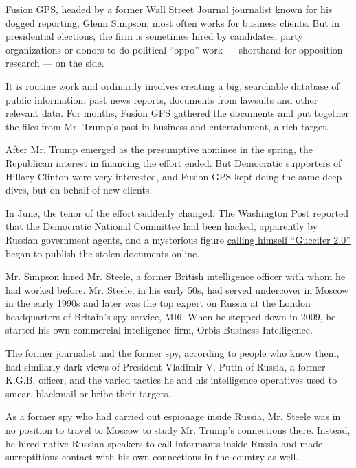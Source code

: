 Fusion GPS, headed by a former Wall Street Journal journalist known for
his dogged reporting, Glenn Simpson, most often works for business
clients. But in presidential elections, the firm is sometimes hired by
candidates, party organizations or donors to do political ``oppo'' work
--- shorthand for opposition research --- on the side.

It is routine work and ordinarily involves creating a big, searchable
database of public information: past news reports, documents from
lawsuits and other relevant data. For months, Fusion GPS gathered the
documents and put together the files from Mr. Trump's past in business
and entertainment, a rich target.

After Mr. Trump emerged as the presumptive nominee in the spring, the
Republican interest in financing the effort ended. But Democratic
supporters of Hillary Clinton were very interested, and Fusion GPS kept
doing the same deep dives, but on behalf of new clients.

In June, the tenor of the effort suddenly changed.
\href{https://www.washingtonpost.com/world/national-security/russian-government-hackers-penetrated-dnc-stole-opposition-research-on-trump/2016/06/14/cf006cb4-316e-11e6-8ff7-7b6c1998b7a0_story.html}{The
Washington Post reported} that the Democratic National Committee had
been hacked, apparently by Russian government agents, and a mysterious
figure
\href{https://www.nytimes3xbfgragh.onion/2016/07/28/us/politics/is-dnc-email-hacker-a-person-or-a-russian-front-experts-arent-sure.html}{calling
himself ``Guccifer 2.0''} began to publish the stolen documents online.

Mr. Simpson hired Mr. Steele, a former British intelligence officer with
whom he had worked before. Mr. Steele, in his early 50s, had served
undercover in Moscow in the early 1990s and later was the top expert on
Russia at the London headquarters of Britain's spy service, MI6. When he
stepped down in 2009, he started his own commercial intelligence firm,
Orbis Business Intelligence.

The former journalist and the former spy, according to people who know
them, had similarly dark views of President Vladimir V. Putin of Russia,
a former K.G.B. officer, and the varied tactics he and his intelligence
operatives used to smear, blackmail or bribe their targets.

As a former spy who had carried out espionage inside Russia, Mr. Steele
was in no position to travel to Moscow to study Mr. Trump's connections
there. Instead, he hired native Russian speakers to call informants
inside Russia and made surreptitious contact with his own connections in
the country as well.

